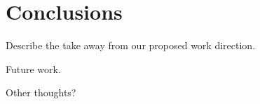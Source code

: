 \section{Conclusions}


Describe the take away from our proposed work direction.

Future work.

Other thoughts?

